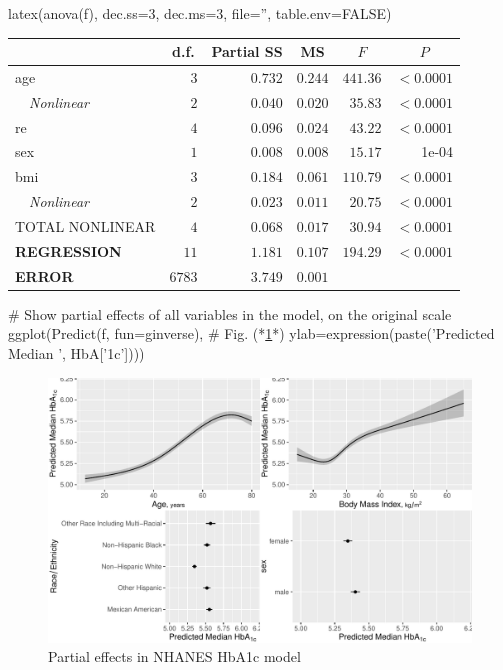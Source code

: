 {\begin{Sinput}
latex(anova(f), dec.ss=3, dec.ms=3, file='', table.env=FALSE)
\end{Sinput}
\begin{center}
\begin{tabular}{lrrrrr}
\hline\hline
\multicolumn{1}{l}{}&\multicolumn{1}{c}{d.f.}&\multicolumn{1}{c}{Partial SS}&\multicolumn{1}{c}{MS}&\multicolumn{1}{c}{$F$}&\multicolumn{1}{c}{$P$}\tabularnewline
\hline
age&$   3$&$0.732$&$0.244$&$441.36$&$<0.0001$\tabularnewline
~~{\it Nonlinear}&$   2$&$0.040$&$0.020$&$ 35.83$&$<0.0001$\tabularnewline
re&$   4$&$0.096$&$0.024$&$ 43.22$&$<0.0001$\tabularnewline
sex&$   1$&$0.008$&$0.008$&$ 15.17$&~1e-04\tabularnewline
bmi&$   3$&$0.184$&$0.061$&$110.79$&$<0.0001$\tabularnewline
~~{\it Nonlinear}&$   2$&$0.023$&$0.011$&$ 20.75$&$<0.0001$\tabularnewline
TOTAL NONLINEAR&$   4$&$0.068$&$0.017$&$ 30.94$&$<0.0001$\tabularnewline
{\bf REGRESSION }&$  11$&$1.181$&$0.107$&$194.29$&$<0.0001$\tabularnewline
{\bf ERROR }&$6783$&$3.749$&$0.001$&$$&\tabularnewline
\hline
\end{tabular}\end{center}
\begin{Sinput}
cat('}\n')
\end{Sinput}
}
\begin{Sinput}
# Show partial effects of all variables in the model, on the original scale
ggplot(Predict(f, fun=ginverse),   # Fig. (*\ref{fig:descript-rmsa}*)
       ylab=expression(paste('Predicted Median ', HbA['1c'])))
\end{Sinput}
\begin{figure}[htbp]

\centerline{\includegraphics{descript-rmsa-1} }

\caption[Partial effects in NHANES HbA1c model]{Partial effects in NHANES HbA1c model}\label{fig:descript-rmsa}
\end{figure}

